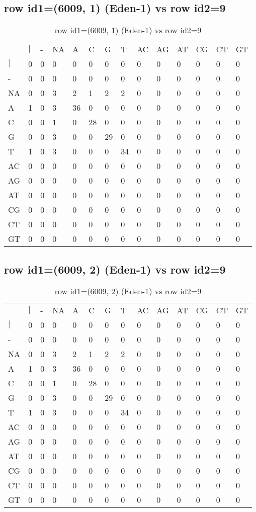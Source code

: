 \subsection{row id1=(6009, 1) (Eden-1) vs row id2=9}
\begin{center}
\begin{longtable}{|l|l|l|l|l|l|l|l|l|l|l|l|l|l|}
\caption{row id1=(6009, 1) (Eden-1) vs row id2=9} \label{table_dm10}\\
\hline
\\
\hline
&$|$&-&NA&A&C&G&T&AC&AG&AT&CG&CT&GT\\
$|$&0&0&0&0&0&0&0&0&0&0&0&0&0\\
-&0&0&0&0&0&0&0&0&0&0&0&0&0\\
NA&0&0&3&2&1&2&2&0&0&0&0&0&0\\
A&1&0&3&36&0&0&0&0&0&0&0&0&0\\
C&0&0&1&0&28&0&0&0&0&0&0&0&0\\
G&0&0&3&0&0&29&0&0&0&0&0&0&0\\
T&1&0&3&0&0&0&34&0&0&0&0&0&0\\
AC&0&0&0&0&0&0&0&0&0&0&0&0&0\\
AG&0&0&0&0&0&0&0&0&0&0&0&0&0\\
AT&0&0&0&0&0&0&0&0&0&0&0&0&0\\
CG&0&0&0&0&0&0&0&0&0&0&0&0&0\\
CT&0&0&0&0&0&0&0&0&0&0&0&0&0\\
GT&0&0&0&0&0&0&0&0&0&0&0&0&0\\
\hline
\end{longtable}
\end{center}

\subsection{row id1=(6009, 2) (Eden-1) vs row id2=9}
\begin{center}
\begin{longtable}{|l|l|l|l|l|l|l|l|l|l|l|l|l|l|}
\caption{row id1=(6009, 2) (Eden-1) vs row id2=9} \label{table_dm12}\\
\hline
\\
\hline
&$|$&-&NA&A&C&G&T&AC&AG&AT&CG&CT&GT\\
$|$&0&0&0&0&0&0&0&0&0&0&0&0&0\\
-&0&0&0&0&0&0&0&0&0&0&0&0&0\\
NA&0&0&3&2&1&2&2&0&0&0&0&0&0\\
A&1&0&3&36&0&0&0&0&0&0&0&0&0\\
C&0&0&1&0&28&0&0&0&0&0&0&0&0\\
G&0&0&3&0&0&29&0&0&0&0&0&0&0\\
T&1&0&3&0&0&0&34&0&0&0&0&0&0\\
AC&0&0&0&0&0&0&0&0&0&0&0&0&0\\
AG&0&0&0&0&0&0&0&0&0&0&0&0&0\\
AT&0&0&0&0&0&0&0&0&0&0&0&0&0\\
CG&0&0&0&0&0&0&0&0&0&0&0&0&0\\
CT&0&0&0&0&0&0&0&0&0&0&0&0&0\\
GT&0&0&0&0&0&0&0&0&0&0&0&0&0\\
\hline
\end{longtable}
\end{center}

